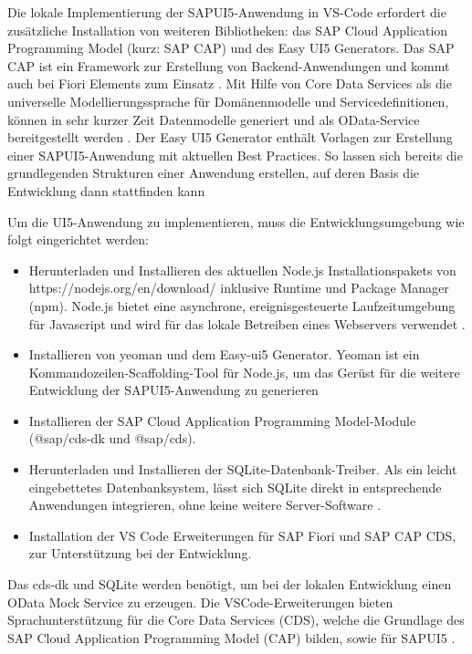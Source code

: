 Die lokale Implementierung der SAPUI5-Anwendung in VS-Code erfordert die zusätzliche Installation von weiteren Bibliotheken: das SAP Cloud Application Programming Model (kurz: SAP CAP) und des Easy UI5 Generators. Das SAP CAP ist ein Framework zur Erstellung von Backend-Anwendungen und kommt auch bei Fiori Elements zum Einsatz \cite{cap:ov}. Mit Hilfe von Core Data Services als die universelle Modellierungssprache für Domänenmodelle und Servicedefinitionen, können in sehr kurzer Zeit Datenmodelle generiert und als OData-Service bereitgestellt werden \cite{cap:ov}. Der Easy UI5 Generator enthält Vorlagen zur Erstellung einer SAPUI5-Anwendung mit aktuellen Best Practices. So lassen sich bereits die grundlegenden Strukturen einer Anwendung erstellen, auf deren Basis die Entwicklung dann stattfinden kann \cite{cap:geui5} 

Um die UI5-Anwendung zu implementieren, muss die Entwicklungsumgebung wie folgt eingerichtet werden:
\begin{itemize}[noitemsep]
\item Herunterladen und Installieren des aktuellen Node.js Installationspakets von https://nodejs.org/en/download/ inklusive Runtime und Package Manager (npm). Node.js bietet eine asynchrone, ereignisgesteuerte Laufzeitumgebung für Javascript und wird für das lokale Betreiben eines Webservers verwendet \cite{wiki:nodejs}.
\item Installieren von yeoman und dem Easy-ui5 Generator. Yeoman ist ein Kommandozeilen-Scaffolding-Tool für Node.js, um das Gerüst für die weitere Entwicklung der SAPUI5-Anwendung zu generieren 
\item Installieren der SAP Cloud Application Programming Model-Module (@sap/cds-dk und @sap/cds). 
\item Herunterladen und Installieren der SQLite-Datenbank-Treiber. Als ein leicht eingebettetes Datenbanksystem, lässt sich SQLite direkt in entsprechende Anwendungen integrieren, ohne keine weitere Server-Software \cite{wiki:sqlite}.
\item Installation der VS Code Erweiterungen für SAP Fiori und SAP CAP CDS, zur Unterstützung bei der Entwicklung.
\end{itemize}

Das cds-dk und SQLite werden benötigt, um bei der lokalen Entwicklung einen OData Mock Service zu erzeugen. Die VSCode-Erweiterungen bieten Sprachunterstützung für die Core Data Services (CDS), welche die Grundlage des SAP Cloud Application Programming Model (CAP) bilden, sowie für SAPUI5 \cite{vsc:cdsext}.

